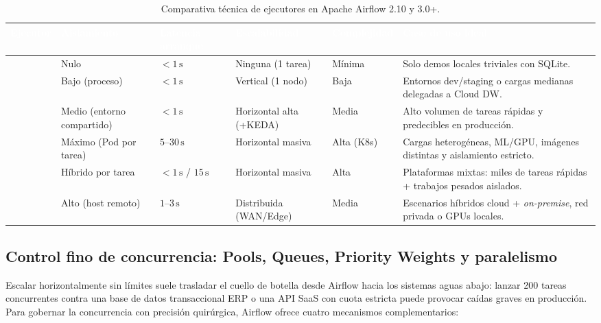 \begin{table}[htbp]
\centering
\caption{Comparativa técnica de ejecutores en Apache Airflow 2.10 y 3.0+.}
\label{tab:comparativa-ejecutores}
\footnotesize
\begin{tabularx}{\textwidth}{@{}L{2.95cm} C{1.6cm} C{1.55cm} C{1.65cm} C{1.65cm} Y@{}}
\toprule
{}
\textcolor{white}{\sffamily\bfseries Ejecutor} &
\textcolor{white}{\sffamily\bfseries Aislamiento} &
\textcolor{white}{\sffamily\bfseries Latencia arranque} &
\textcolor{white}{\sffamily\bfseries Escalabilidad} &
\textcolor{white}{\sffamily\bfseries Complejidad} &
\textcolor{white}{\sffamily\bfseries Caso de uso ideal} \\
\midrule
{} & Nulo & $<1\,\text{s}$ & Ninguna (1 tarea) & Mínima & Solo demos locales triviales con SQLite. \\
 & Bajo (proceso) & $<1\,\text{s}$ & Vertical (1 nodo) & Baja & Entornos dev/staging o cargas medianas delegadas a Cloud DW. \\
 & Medio (entorno compartido) & $<1\,\text{s}$ & Horizontal alta (+KEDA) & Media & Alto volumen de tareas rápidas y predecibles en producción. \\
 & Máximo (Pod por tarea) & $5\text{--}30\,\text{s}$ & Horizontal masiva & Alta (K8s) & Cargas heterogéneas, ML/GPU, imágenes distintas y aislamiento estricto. \\
 & Híbrido por tarea & $<1\,\text{s}$ / $15\,\text{s}$ & Horizontal masiva & Alta & Plataformas mixtas: miles de tareas rápidas + trabajos pesados aislados. \\
  & Alto (host remoto) & $1\text{--}3\,\text{s}$ & Distribuida (WAN/Edge) & Media & Escenarios híbridos cloud + \textit{on-premise}, red privada o GPUs locales. \\
\bottomrule
\end{tabularx}
\end{table}

\subsection{Control fino de concurrencia: Pools, Queues, Priority Weights y paralelismo}\label{subsec:concurrencia}

Escalar horizontalmente sin límites suele trasladar el cuello de botella desde Airflow hacia los sistemas aguas abajo: lanzar 200 tareas concurrentes contra una base de datos transaccional ERP o una API SaaS con cuota estricta puede provocar caídas graves en producción. Para gobernar la concurrencia con precisión quirúrgica, Airflow ofrece cuatro mecanismos complementarios:

